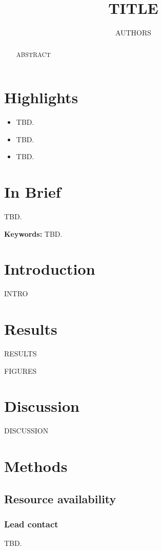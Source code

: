\documentclass[11pt]{article}
\title{{{TITLE}}}
\author{{{AUTHORS}}}
\begin{document}
\maketitle

\section*{Highlights}
\begin{itemize}
\item TBD.
\item TBD.
\item TBD.
\end{itemize}

\section*{In Brief}
TBD.

\begin{abstract}
{ABSTRACT}
\end{abstract}

\textbf{Keywords:} TBD. %

\section{Introduction}
{INTRO}

\section{Results}
{RESULTS}

{FIGURES}

\section{Discussion}
{DISCUSSION}

\section{Methods}
\subsection{Resource availability}
\subsubsection{Lead contact}
TBD.
\end{document}
